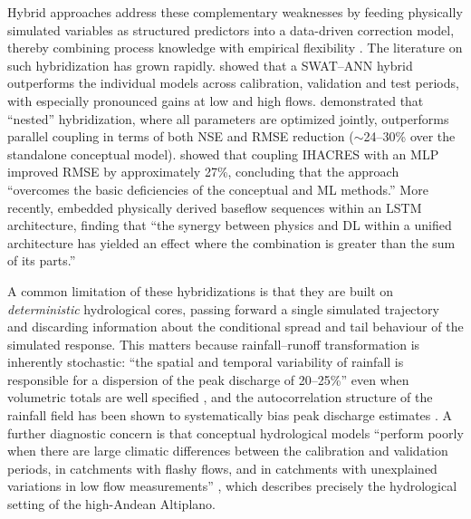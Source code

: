 \documentclass[a4paper,fleqn]{cas-sc}
\begin{document}
Hybrid approaches address these complementary weaknesses by feeding
physically simulated variables as structured predictors into a
data-driven correction model, thereby combining process knowledge with
empirical flexibility \citep{mohammadi2022,mekonnen2015}. The
literature on such hybridization has grown rapidly.
\citet{mekonnen2015} showed that a SWAT--ANN hybrid outperforms the
individual models across calibration, validation and test periods, with
especially pronounced gains at low and high flows.
\citet{okkan2021} demonstrated that ``nested'' hybridization, where all
parameters are optimized jointly, outperforms parallel coupling in
terms of both NSE and RMSE reduction ($\sim$24--30\% over the
standalone conceptual model). \citet{mohammadi2022} showed that
coupling IHACRES with an MLP improved RMSE by approximately 27\%,
concluding that the approach ``overcomes the basic deficiencies of the
conceptual and ML methods.'' More recently, \citet{li2024process}
embedded physically derived baseflow sequences within an LSTM
architecture, finding that ``the synergy between physics and DL within
a unified architecture has yielded an effect where the combination is
greater than the sum of its parts.''

A common limitation of these hybridizations is that they are built on
\emph{deterministic} hydrological cores, passing forward a single
simulated trajectory and discarding information about the conditional
spread and tail behaviour of the simulated response. This matters
because rainfall--runoff transformation is inherently stochastic:
``the spatial and temporal variability of rainfall is responsible for a
dispersion of the peak discharge of 20--25\%'' even when volumetric
totals are well specified \citep{gabellani2007}, and the autocorrelation
structure of the rainfall field has been shown to systematically bias
peak discharge estimates \citep{gabellani2007,hong2006}. A further
diagnostic concern is that conceptual hydrological models ``perform
poorly when there are large climatic differences between the calibration
and validation periods, in catchments with flashy flows, and in
catchments with unexplained variations in low flow measurements''
\citep{van2013}, which describes precisely the hydrological setting of
the high-Andean Altiplano.
\end{document}
